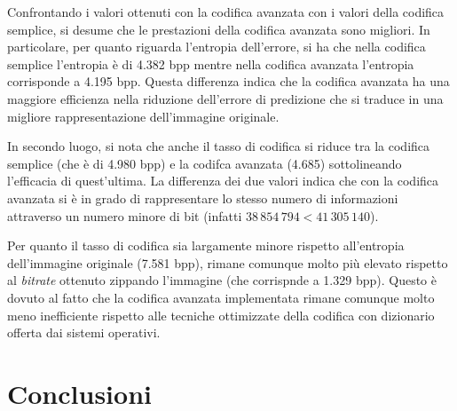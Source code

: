 Confrontando i valori ottenuti con la codifica avanzata con i valori della codifica semplice, si desume che le prestazioni della codifica avanzata sono migliori. In particolare, per quanto riguarda l'entropia dell'errore, si ha che nella codifica semplice l'entropia è di 4.382 bpp mentre nella codifica avanzata l'entropia corrisponde a 4.195 bpp. Questa differenza indica che la codifica avanzata ha una maggiore efficienza nella riduzione dell'errore di predizione che si traduce in una migliore rappresentazione dell'immagine originale.

In secondo luogo, si nota che anche il tasso di codifica si riduce tra la codifica semplice (che è di 4.980 bpp) e la codifca avanzata (4.685) sottolineando l'efficacia di quest'ultima. La differenza dei due valori indica che con la codifica avanzata si è in grado di rappresentare lo stesso numero di informazioni attraverso un numero minore di bit (infatti $38\,854\,794 < 41\,305\,140$).

Per quanto il tasso di codifica sia largamente minore rispetto all'entropia dell'immagine originale (7.581 bpp), rimane comunque molto più elevato rispetto al \textsl{bitrate} ottenuto zippando l'immagine (che corrispnde a 1.329 bpp). Questo è dovuto al fatto che la codifica avanzata implementata rimane comunque molto meno inefficiente rispetto alle tecniche ottimizzate della codifica con dizionario offerta dai sistemi operativi.






\vspace{15px}\section{Conclusioni}




